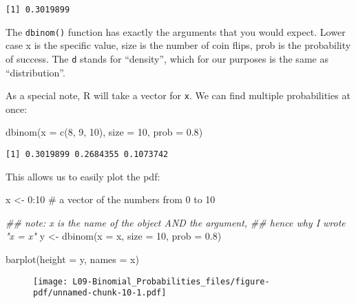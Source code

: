 \documentclass[
  letterpaper,
  DIV=11,
  numbers=noendperiod]{scrreprt}
\newenvironment{Shaded}{\begin{snugshade}}{\end{snugshade}}
\newcommand{\AttributeTok}[1]{\textcolor[rgb]{0.40,0.45,0.13}{#1}}
\newcommand{\CommentTok}[1]{\textcolor[rgb]{0.37,0.37,0.37}{#1}}
\newcommand{\DecValTok}[1]{\textcolor[rgb]{0.68,0.00,0.00}{#1}}
\newcommand{\DocumentationTok}[1]{\textcolor[rgb]{0.37,0.37,0.37}{\textit{#1}}}
\newcommand{\FloatTok}[1]{\textcolor[rgb]{0.68,0.00,0.00}{#1}}
\newcommand{\FunctionTok}[1]{\textcolor[rgb]{0.28,0.35,0.67}{#1}}
\newcommand{\NormalTok}[1]{\textcolor[rgb]{0.00,0.23,0.31}{#1}}
\newcommand{\OtherTok}[1]{\textcolor[rgb]{0.00,0.23,0.31}{#1}}
\newcommand{\SpecialCharTok}[1]{\textcolor[rgb]{0.37,0.37,0.37}{#1}}
\begin{document}
\begin{verbatim}
[1] 0.3019899
\end{verbatim}

The \texttt{dbinom()} function has exactly the arguments that you would
expect. Lower case x is the specific value, size is the number of coin
flips, prob is the probability of success. The \texttt{d} stands for
``density'', which for our purposes is the same as ``distribution''.

As a special note, R will take a vector for \texttt{x}. We can find
multiple probabilities at once:

\begin{Shaded}
\begin{Highlighting}[]
\FunctionTok{dbinom}\NormalTok{(}\AttributeTok{x =} \FunctionTok{c}\NormalTok{(}\DecValTok{8}\NormalTok{, }\DecValTok{9}\NormalTok{, }\DecValTok{10}\NormalTok{), }\AttributeTok{size =} \DecValTok{10}\NormalTok{, }\AttributeTok{prob =} \FloatTok{0.8}\NormalTok{)}
\end{Highlighting}
\end{Shaded}

\begin{verbatim}
[1] 0.3019899 0.2684355 0.1073742
\end{verbatim}

This allows us to easily plot the pdf:

\begin{Shaded}
\begin{Highlighting}[]
\NormalTok{x }\OtherTok{\textless{}{-}} \DecValTok{0}\SpecialCharTok{:}\DecValTok{10} \CommentTok{\# a vector of the numbers from 0 to 10}

\DocumentationTok{\#\# note: x is the name of the object AND the argument,}
\DocumentationTok{\#\# hence why I wrote "x = x"}
\NormalTok{y }\OtherTok{\textless{}{-}} \FunctionTok{dbinom}\NormalTok{(}\AttributeTok{x =}\NormalTok{ x, }\AttributeTok{size =} \DecValTok{10}\NormalTok{, }\AttributeTok{prob =} \FloatTok{0.8}\NormalTok{)}

\FunctionTok{barplot}\NormalTok{(}\AttributeTok{height =}\NormalTok{ y, }\AttributeTok{names =}\NormalTok{ x)}
\end{Highlighting}
\end{Shaded}

\begin{figure}[H]

{\centering \texttt{[image: L09-Binomial\_Probabilities\_files/figure-pdf/unnamed-chunk-10-1.pdf]}

}

\end{figure}
\end{document}
